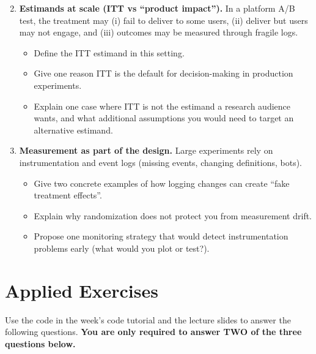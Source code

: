 \documentclass[11pt]{article}
\begin{document}
\begin{enumerate}
\setcounter{enumi}{1}
\item \textbf{Estimands at scale (ITT vs ``product impact'').}
In a platform A/B test, the treatment may (i) fail to deliver to some users, (ii) deliver but users may not engage, and (iii) outcomes may be measured through fragile logs.
\begin{itemize}
  \item Define the ITT estimand in this setting.
  \item Give one reason ITT is the default for decision-making in production experiments.
  \item Explain one case where ITT is not the estimand a research audience wants, and what additional assumptions you would need to target an alternative estimand.
\end{itemize}

\item \textbf{Measurement as part of the design.}
Large experiments rely on instrumentation and event logs (missing events, changing definitions, bots).
\begin{itemize}
  \item Give two concrete examples of how logging changes can create ``fake treatment effects''.
  \item Explain why randomization does not protect you from measurement drift.
  \item Propose one monitoring strategy that would detect instrumentation problems early (what would you plot or test?).
\end{itemize}
\end{enumerate}

\section*{Applied Exercises}
Use the code in the week’s code tutorial and the lecture slides to answer the following questions. \textbf{You are only required to answer TWO of the three questions below.} \bigskip
\end{document}
